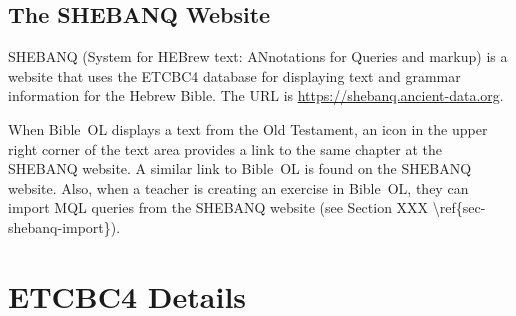 \documentclass[11pt,oneside,a4paper]{memoir}
\begin{document}

\section{The SHEBANQ Website}\label{sec-shebanq}

SHEBANQ (System for HEBrew text: ANnotations for Queries and markup) is a website that uses the
ETCBC4 database for displaying text and grammar information for the Hebrew Bible. The URL is
\url{https://shebanq.ancient-data.org}.

When Bible~OL displays a text from the Old Testament, an icon in the upper right corner of the text
area provides a link to the same chapter at the SHEBANQ website. A similar link to Bible~OL is found
on the SHEBANQ website. Also, when a teacher is creating an exercise in Bible~OL, they can import
MQL queries from the SHEBANQ website (see Section XXX \textbackslash{}ref\{sec-shebanq-import\}).



\appendix
\chapter{ETCBC4 Details}\label{app-etcbc}
\end{document}
